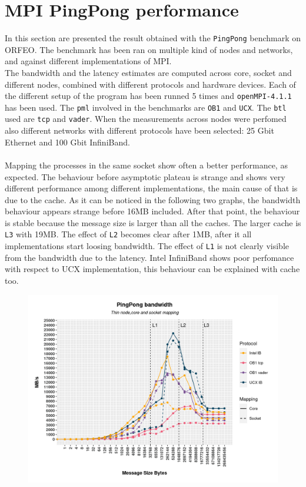 \documentclass[11pt,a4paper]{article}
\begin{document}
\section{MPI PingPong performance}
In this section are presented the result obtained with the \texttt{PingPong} benchmark on ORFEO. The benchmark has been ran on multiple kind of nodes and networks, and against different implementations of MPI. \\
\indent The bandwidth and the latency estimates are computed across core, socket and different nodes, combined with different protocols and hardware devices. Each of the different setup of the program has been runned 5 times and \texttt{openMPI-4.1.1} has been used. The \texttt{pml} involved in the benchmarks are \texttt{OB1} and \texttt{UCX}. The \texttt{btl} used are \texttt{tcp} and \texttt{vader}. When the measurements across nodes were perfomed also different networks with different protocols have been selected: 25 Gbit Ethernet and 100 Gbit InfiniBand.\\
\\
Mapping the processes in the same socket show often a better performance, as expected. The behaviour before asymptotic plateau is strange and shows very different performance among different implementations, the main cause of that is due to the cache. As it can be noticed in the following two graphs, the bandwidth behaviour appears strange before 16MB included. After that point, the behaviour is stable because the message size is larger than all the caches. The larger cache is \texttt{L3} with 19MB. The effect of \texttt{L2} becomes clear after 1MB, after it all implementations start loosing bandwidth. The effect of \texttt{L1} is not clearly visible from the bandwidth due to the latency. Intel InfiniBand shows poor perfomance with respect to UCX implementation, this behaviour can be explained with cache too. 
\begin{figure}[h!]
    \centering
    \includegraphics[width=\textwidth]{PingPongBandwidth.png}
    \label{fig:ThinPingPongBandwidth}
\end{figure}
\end{document}
